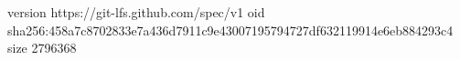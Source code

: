version https://git-lfs.github.com/spec/v1
oid sha256:458a7c8702833e7a436d7911c9e43007195794727df632119914e6eb884293c4
size 2796368
